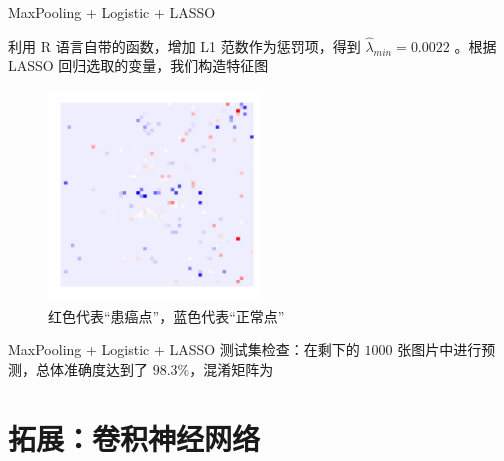 \documentclass[11pt]{beamer}
\begin{document}
\begin{frame}{MaxPooling + Logistic + LASSO}{}
\fontsize{9pt}{11pt}\selectfont

利用 R 语言自带的函数，增加 L1 范数作为惩罚项，得到 $\hat{\lambda}_{min} = 0.0022$ 。根据 LASSO 
回归选取的变量，我们构造特征图

\begin{figure}
  \centering
  \includegraphics[width=0.5\textwidth]{../Features/lasso_features.jpg}
  \caption{红色代表“患癌点”，蓝色代表“正常点”}
\end{figure}

\end{frame}


\begin{frame}{MaxPooling + Logistic + LASSO}{}
\fontsize{9pt}{11pt}\selectfont
测试集检查：在剩下的 $1000$ 张图片中进行预测，总体准确度达到了 $98.3\%$，混淆矩阵为



\end{frame}

\section{拓展：卷积神经网络}
\end{document}
